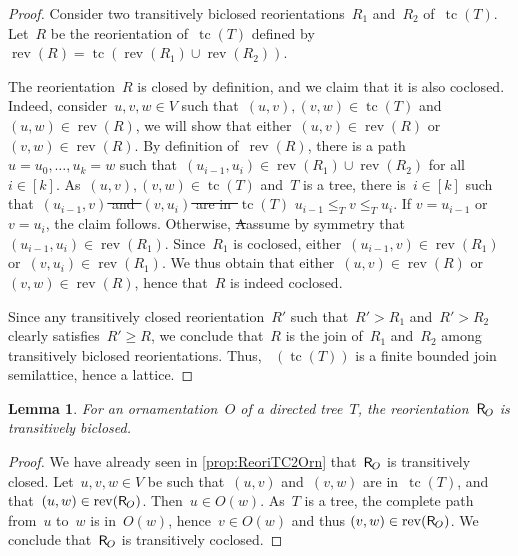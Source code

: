 \documentclass{amsart}
\newtheorem{lemma}[theorem]{Lemma}
\theoremstyle{definition}
\renewcommand{\c}[1]{\mathcal{#1}} %
\DeclareMathOperator{\tc}{tc} %
\newcommand{\jose}[1]{{\color{red}#1}}
\newcommand{\mymap}[2]{\mathsf{#1}_{\hspace{-.7pt}#2}}
\newcommand{\reori}[1]{\mymap{R}{#1}}  %
\DeclareMathOperator{\Rbi}{\c{R}^{bi}}  %
\DeclareMathOperator{\rev}{rev} %
\begin{document}
\begin{proof}
Consider two transitively biclosed reorientations~$R_1$ and~$R_2$ of~$\tc(T)$.
Let~$R$ be the reorientation of~$\tc(T)$ defined by~$\rev(R) = \tc(\rev(R_1) \cup \rev(R_2))$.

The reorientation~$R$ is closed by definition, and we claim that it is also coclosed.
Indeed, consider~$u,v,w \in V$ such that~$(u,v), (v,w) \in \tc(T)$ and~$(u,w) \in \rev(R)$\jose{, we will show that either~$(u,v) \in \rev(R)$ or~$(v,w) \in \rev(R)$}.
By definition of~$\rev(R)$, there is a path~$u = u_0, \dots, u_k = w$ such that~$(u_{i-1}, u_i) \in \rev(R_1) \cup \rev(R_2)$ for all~$i \in [k]$.
As~$(u,v), (v,w) \in \tc(T)$ and~$T$ is a tree, there is~$i \in [k]$ such that~\jose{\sout{$(u_{i-1}, v)$ and~$(v, u_i)$ are in~$\tc(T)$} $u_{i-1} \le_T v \le_T u_i$. If $v = u_{i-1}$ or $v = u_i$, the claim follows. Otherwise, 
\sout{A}a}ssume by symmetry that~$(u_{i-1}, u_i) \in \rev(R_1)$.
Since~$R_1$ is coclosed, either~$(u_{i-1}, v) \in \rev(R_1)$ or~$(v, u_i) \in \rev(R_1)$.
We thus obtain that either~$(u,v) \in \rev(R)$ or~$(v,w) \in \rev(R)$, hence that~$R$ is indeed coclosed.

Since any transitively closed reorientation~$R'$ such that~$R' > R_1$ and~$R' > R_2$ clearly satisfies~$R' \ge R$, we conclude that~$R$ is the join of~$R_1$ and~$R_2$ among transitively biclosed reorientations.
Thus, $\Rbi(\tc(T))$ is a finite bounded join semilattice, hence a lattice.
\end{proof}

\begin{lemma}
\label{lem:Orn2ReoriT}
For an ornamentation~$O$ of a directed tree~$T$, the reorientation~$\reori{O}$ is transitively biclosed.
\end{lemma}

\begin{proof}
We have already seen in \cref{prop:ReoriTC2Orn} that~$\reori{O}$ is transitively closed.
Let~$u, v, w \in V$ be such that~$(u,v)$ and~$(v,w)$ are in~$\tc(T)$,
and that~$(u,w) \in \rev(\reori{O})$. Then~$u \in O(w)$. As~$T$ is a tree, the complete path from~$u$ to~$w$ is in~$O(w)$, hence~$v \in O(w)$ and thus $(v,w) \in \rev(\reori{O})$.
We conclude that~$\reori{O}$ is transitively coclosed.
\end{proof}
\end{document}
